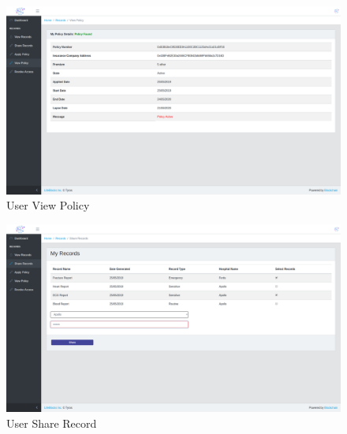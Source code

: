 \begin{figure}[!b]
	\centering
	\includegraphics[width=\linewidth]{Images/User/UserViewPolicy.png}
	\caption{ User View Policy}
\end{figure}
\begin{figure}[!b]
	\centering
	\includegraphics[width=\linewidth]{Images/User/UserShareRecord.png}
	\caption{ User Share Record}
\end{figure}


